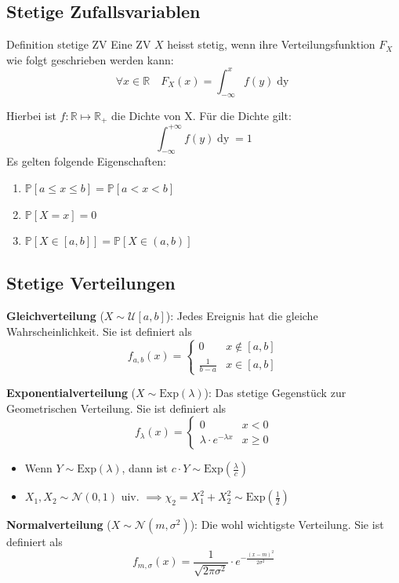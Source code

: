 \documentclass[a4paper,10pt]{article}
\def\R{\mathbb{R}}
\def\P{\mathbb{P}}
\begin{document}
\subsection{Stetige Zufallsvariablen}
\begin{subbox}{Definition stetige ZV}
	Eine ZV \(X\) heisst stetig, wenn ihre Verteilungsfunktion \(F_X\) wie folgt geschrieben werden kann:
	\[\forall x \in \R \quad F_X(x) = \int_{-\infty}^x f(y) \mathop{dy}\]
\end{subbox}
Hierbei ist \(f: \R \mapsto \R_+\) die Dichte von X. Für die Dichte gilt:
\[\int_{-\infty}^{+\infty}f(y) \mathop{dy} = 1\]
Es gelten folgende Eigenschaften:
\begin{enumerate}
	\item \(\P[a \le x \le b] = \P[a < x < b]\)
	\item \(\P[X=x] = 0\)
	\item \(\P[X \in [a,b]] = \P[X \in (a,b)]\)
\end{enumerate}

\subsection{Stetige Verteilungen}
\textbf{Gleichverteilung} (\(X \sim \mathcal{U}[a,b]\)): Jedes Ereignis hat die gleiche Wahrscheinlichkeit. Sie ist definiert als
\[f_{a,b}(x) = \begin{cases}
		0             & x \notin [a,b] \\
		\frac{1}{b-a} & x \in [a,b]
	\end{cases}\]

\noindent \textbf{Exponentialverteilung} (\(X \sim \text{Exp}(\lambda)\)): Das stetige Gegenstück zur Geometrischen Verteilung. Sie ist definiert als
\[f_\lambda(x) = \begin{cases}
		0                            & x < 0    \\
		\lambda \cdot e^{-\lambda x} & x \geq 0
	\end{cases}\]
\begin{itemize}
	\item Wenn \(Y\sim \text{Exp}(\lambda)\), dann ist \(c \cdot Y \sim \text{Exp}(\frac{\lambda}{c})\)
	\item \(X_1, X_2 \sim \mathcal{N}(0,1)\) uiv. \(\implies \chi_2 = X_1^2 +X_2^2 \sim \text{Exp}(\frac{1}{2})\)
\end{itemize}

\noindent \textbf{Normalverteilung} (\(X \sim \mathcal{N}(m, \sigma^2)\)): Die wohl wichtigste Verteilung. Sie ist definiert als
\[f_{m, \sigma}(x) = \frac{1}{\sqrt{2 \pi \sigma^2}} \cdot e^{-\frac{(x-m)^2}{2 \sigma^2}}\]
\end{document}
